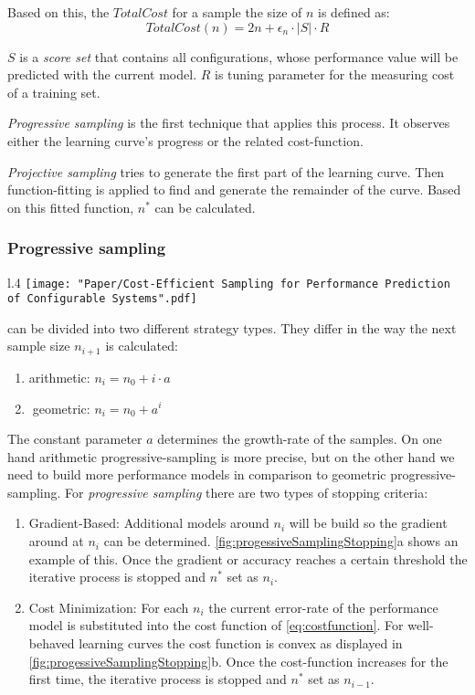 Based on this, the $TotalCost$ for a sample the size of $n$ is defined as:
\begin{equation}
TotalCost(n) = 2n + \epsilon_n \cdot |S| \cdot R \label{eq:costfunction}
\end{equation}

$S$ is a \textit{score set} that contains all configurations, whose performance value will be predicted with the current model. $R$ is tuning parameter for the measuring cost of a training set.

\textit{Progressive sampling} is the first technique that applies this process. It observes either the learning curve's progress or the related cost-function.

\textit{Projective sampling} tries to generate the first part of the learning curve. Then function-fitting is applied to find and generate the remainder of the curve. Based on this fitted function, $n^*$ can be calculated.

\subsubsection{Progressive sampling}
\begin{wrapfigure}[28]{l}{.4\linewidth}
	\texttt{[image: "Paper/Cost-Efficient Sampling for Performance Prediction of Configurable Systems".pdf]}
	\caption{Stopping criteria of \textit{progressive sampling}
	\cite{CostEfficientSampling_Gou_Siegmund_2015}.}
	\label{fig:progessiveSamplingStopping}
\end{wrapfigure}
can be divided into two different strategy types. They differ in the way the next sample size $n_{i+1}$ is calculated:
\begin{enumerate}
	\item arithmetic: $n_i= n_0 +i \cdot a$
	\item $\;$geometric: $n_i = n_0 + a^i$
\end{enumerate}
The constant parameter $a$ determines the growth-rate of the samples. On one hand arithmetic progressive-sampling is more precise, but on the other hand we need to build more performance models in comparison to geometric progressive-sampling.
For \textit{progressive sampling} there are two types of stopping criteria:
\begin{enumerate}
	\item Gradient-Based: Additional models around $n_i$ will be build so the gradient around at $n_i$ can be determined. \cref{fig:progessiveSamplingStopping}a shows an example of this. Once the gradient or accuracy reaches a certain threshold the iterative process is stopped and $n^*$ set as $n_i$.
	\item Cost Minimization: For each $n_i$ the current error-rate of the performance model is substituted into the cost function of \cref{eq:costfunction}. For well-behaved learning curves the cost function is convex as displayed in \cref{fig:progessiveSamplingStopping}b. Once the cost-function increases for the first time, the iterative process is stopped and $n^*$ set as $n_{i-1}$.
\end{enumerate}

